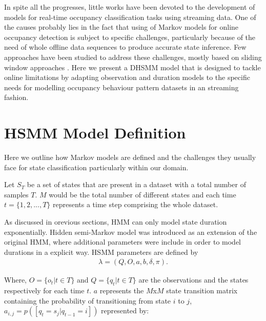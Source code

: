 \documentclass[conference]{IEEEtran}
\begin{document}
In spite all the progresses, little works have been devoted to the development of models for real-time occupancy classification tasks using streaming data. One of the causes probably lies in the fact that using of Markov models for online occupancy detection is subject to specific challenges, particularly because of the need of whole offline data sequences to produce accurate state inference. Few approaches have been studied to address these challenges, mostly based on sliding window approaches \cite{Krishnan2014}. Here we present a DHSMM model that is designed to tackle online limitations by adapting observation and duration models to the specific needs for modelling occupancy behaviour pattern datasets in an streaming fashion.



\section{HSMM Model Definition}


Here we outline how Markov models are defined and the challenges they usually face for state classification particularly within our domain. 

Let $S_T$ be a set of states that are present in a dataset with a total number of samples $T$. $M$ would be the total number of different states and each time $t=\{1,2,...,T\}$ represents a time step comprising the whole dataset.

% 
As discussed in orevious sections, HMM can only model state duration exponentially. Hidden semi-Markov model was introduced as an extension of the original HMM, where additional parameters were include in order to model durations in a explicit way. HSMM parameters are defined by \begin{gather*} 
\lambda= (Q,O, a, b, \delta, \pi).
 \end{gather*}
 
  Where, $O=\{o_{t}|t \in T\}$ and  $Q=\{q_{t}|t \in T\}$ are the observations and the states respectively for each time $t$.  $a$ represents the $M$x$M$ state transition matrix containing the probability of transitioning from state $i$ to $j$, $a_{i,j}=p([q_t=s_j|q_{t-1}=i])$ represented by:
\end{document}
